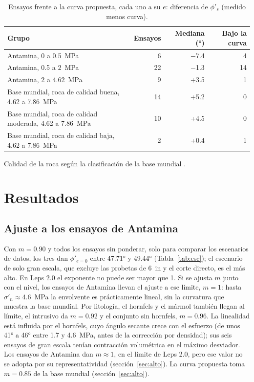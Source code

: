 \documentclass[11pt,letterpaper]{article}
\begin{document}
\begin{table}[!htbp]\centering\small\caption{Ensayos frente a la curva propuesta, cada uno a su $e$: diferencia de $\phi'_s$ (medido menos curva).}\label{tab:cmp}
\begin{tabular}{L{8.6cm}rrr}\toprule Grupo & Ensayos & Mediana (°) & Bajo la curva\\\midrule
Antamina, 0 a 0.5~MPa & 6 & $-$7.4 & 4 \\
Antamina, 0.5 a 2~MPa & 22 & $-$1.3 & 14 \\
Antamina, 2 a 4.62~MPa & 9 & +3.5 & 1 \\
Base mundial, roca de calidad buena, 4.62 a 7.86~MPa & 14 & +5.2 & 0 \\
Base mundial, roca de calidad moderada, 4.62 a 7.86~MPa & 10 & +4.5 & 0 \\
Base mundial, roca de calidad baja, 4.62 a 7.86~MPa & 2 & +0.4 & 1 \\
\bottomrule\end{tabular}\par\vspace{3pt}\footnotesize Calidad de la roca según la clasificación de la base mundial \citep[Tabla~5]{cylwik}.\end{table}

\section{Resultados}\label{sec:res}
\subsection{Ajuste a los ensayos de Antamina}
Con $m = 0.90$ y todos los ensayos sin ponderar, solo para comparar los escenarios de datos, los tres dan $\phi'_{e=0}$ entre 47.71° y 49.44° (Tabla~\ref{tab:esc}); el escenario de solo gran escala, que excluye las probetas de 6~in y el corte directo, es el más alto. En Leps 2.0 el exponente no puede ser mayor que 1. Si se ajusta $m$ junto con el nivel, los ensayos de Antamina llevan el ajuste a ese límite, $m = 1$: hasta $\sigma'_n \approx 4.6$~MPa la envolvente es prácticamente lineal, sin la curvatura que muestra la base mundial. Por litología, el hornfels y el mármol también llegan al límite, el intrusivo da $m = 0.92$ y el conjunto sin hornfels, $m = 0.96$. La linealidad está influida por el hornfels, cuyo ángulo secante crece con el esfuerzo (de unos 41° a 46° entre 1.7 y 4.6~MPa, antes de la corrección por densidad); sus seis ensayos de gran escala tenían contracción volumétrica en el máximo desviador. Los ensayos de Antamina dan $m \approx 1$, en el límite de Leps 2.0, pero ese valor no se adopta por su representatividad (sección~\ref{sec:alto}). La curva propuesta toma $m = 0.85$ de la base mundial (sección~\ref{sec:alto}).
\end{document}
